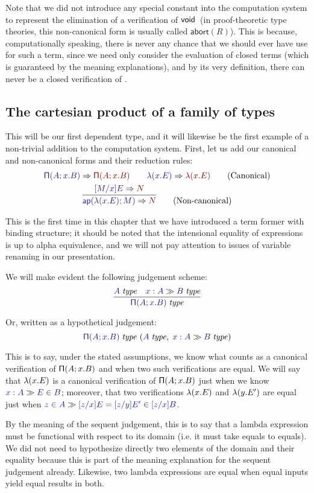 \documentclass[main.tex]{subfiles}
\begin{document}
Note that we did not introduce any special constant into the
computation system to represent the elimination of a verification of
$\mathsf{void}$\ (in proof-theoretic type theories, this non-canonical form
is usually called $\mathsf{abort}(R)$).  This is because,
computationally speaking, there is never any chance that we should
ever have use for such a term, since we need only consider the
evaluation of closed terms (which is guaranteed by the meaning
explanations), and by its very definition, there can never be a closed
verification of \tyvoid.

\subsection{The cartesian product of a family of types}

This will be our first dependent type, and it will likewise be the first
example of a non-trivial addition to the computation system. First, let us add
our canonical and non-canonical forms and their reduction rules:
\begin{gather*}
  \reduce{\typrod{A}{x}{B}}{\typrod{A}{x}{B}}
  \qquad
  \reduce{\lam{x}{E}}{\lam{x}{E}}
  \tag{Canonical}\\
  \infer{
    \reduce{\ap{\lam{x}{E}}{M}}{N}
  }{
    \reduce{[M/x]E}{N}
  }\tag{Non-canonical}
\end{gather*}

This is the first time in this chapter that we have introduced a term former
with binding structure; it should be noted that the intensional equality of
expressions is up to alpha equivalence, and we will not pay attention to issues
of variable renaming in our presentation.

We will make evident the following judgement scheme:
\[
  \infer{
    \isset{\typrod{A}{x}{B}}
  }{
    \isset{A} &
    \sequent{x:A}{\isset{B}}
  }
\]

Or, written as a hypothetical judgement:
\[
  \hyp{\isset{\typrod{A}{x}{B}}}{\isset{A},\;\sequent{x:A}{\isset{B}}}
\]

This is to say, under the stated assumptions, we know what counts as a
canonical verification of $\mathsf{\Pi}(A;x.B)$ and when two such
verifications are equal. We will say that $\mathsf{\lambda}(x.E)$ is a canonical
verification of $\mathsf{\Pi}(A;x.B)$ just when we know
$\sequent{x:A}{\ver{E}{B}}$; moreover, that two verifications
$\mathsf{\lambda}(x.E)$ and $\mathsf{\lambda}(y.E')$ are equal just when
$\sequent{\ver{z}{A}}{\ver{[z/x]E=[z/y]E'}{[z/x]B}}$.

By the meaning of the sequent judgement, this is to say that a lambda
expression must be functional with respect to its domain (i.e. it must take
equals to equals). We did not need to hypothesize directly two elements of the
domain and their equality because this is part of the meaning explanation for
the sequent judgement already. Likewise, two lambda expressions are equal when
equal inputs yield equal results in both.
\end{document}

